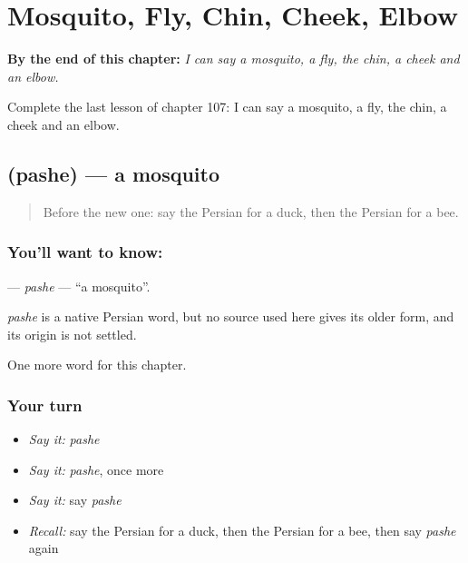 
\chapter{Mosquito, Fly, Chin, Cheek, Elbow}
\label{ch:fa-mosquito-fly-chin-cheek-elbow}

\begin{chapteropening}
\textbf{By the end of this chapter:} \emph{I can say a mosquito, a fly, the chin, a cheek and an elbow.}

Complete the last lesson of chapter 107: I can say a mosquito, a fly, the chin, a cheek and an elbow.
\end{chapteropening}

\section[\texorpdfstring{\fa{پشه} (pashe)}{پشه (pashe)}]{ (pashe) — a mosquito}

\label{lesson:FA-C107-pashe}



\begin{quote}
Before the new one: say the Persian for a duck, then the Persian for a bee.
\end{quote}

\subsection*{You'll want to know: }
\textbf{} — \emph{pashe} — \textquotedblleft{}a mosquito\textquotedblright{}.

\begin{cousinweb}
\emph{pashe} is a native Persian word, but no source used here gives its older form, and its origin is not settled.
\end{cousinweb}

\begin{grammarlens}[title={What you've built}]
One more word for this chapter.
\end{grammarlens}

\subsection*{Your turn}
\begin{itemize}
\raggedright
  \item \emph{Say it:} \emph{pashe}
  \item \emph{Say it:} \emph{pashe}, once more
  \item \emph{Say it:} say \emph{pashe}
  \item \emph{Recall:} say the Persian for a duck, then the Persian for a bee, then say \emph{pashe} again
\end{itemize}


